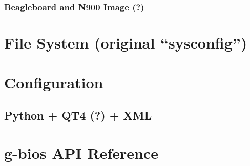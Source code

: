 \documentclass[a4paper,11pt]{book}
\begin{document}
\begin{CJK*}{UTF8}{gbsn}
\subsection{Beagleboard and N900 Image (?)}

\chapter{File System (original ``sysconfig'')}

\chapter{Configuration}

\section{Python + QT4 (?) + XML}

\chapter{g-bios API Reference}


\clearpage
\end{CJK*}
\end{document}
